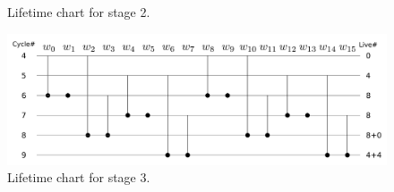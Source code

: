 \begin{frame}
\begin{columns}[t,onlytextwidth]
\begin{column}{0.5\linewidth}
\begin{figure}[h!]
	    		\caption{\footnotesize Lifetime chart for stage 2.}
	    	\end{figure}
			\vspace{-1cm}	    	
	    	\begin{figure}[h!] \centering
	    		\includegraphics[width=0.40\paperwidth]{./image/life_chart_c.png}
	    		\caption{\footnotesize Lifetime chart for stage 3.}	    	
	    	\end{figure}  
   		\end{column}
	\end{columns}
\end{frame}

